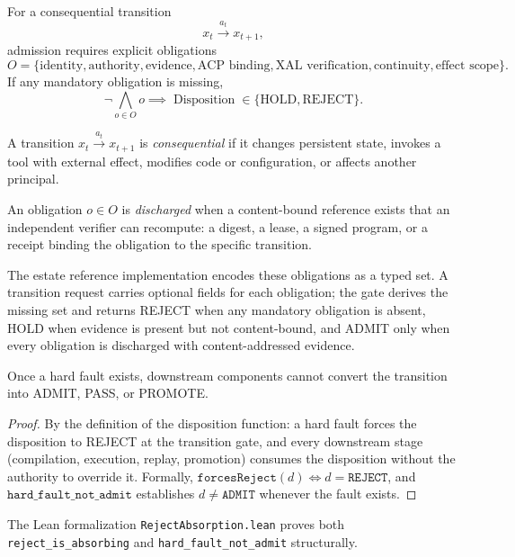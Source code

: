 For a consequential transition
\[
x_t \xrightarrow{a_t} x_{t+1},
\]
admission requires explicit obligations
\[
O = \{\text{identity}, \text{authority}, \text{evidence},
\text{ACP binding}, \text{XAL verification}, \text{continuity},
\text{effect scope}\}.
\]
If any mandatory obligation is missing,
\[
\neg\bigwedge_{o \in O} o \implies
\operatorname{Disposition} \in \{\text{HOLD}, \text{REJECT}\}.
\]

\begin{definition}
A transition $x_t \xrightarrow{a_t} x_{t+1}$ is \emph{consequential} if it
changes persistent state, invokes a tool with external effect, modifies
code or configuration, or affects another principal.
\end{definition}

\begin{definition}
An obligation $o \in O$ is \emph{discharged} when a content-bound reference
exists that an independent verifier can recompute: a digest, a lease, a
signed program, or a receipt binding the obligation to the specific
transition.
\end{definition}

The estate reference implementation encodes these obligations as a typed
set. A transition request carries optional fields for each obligation;
the gate derives the missing set and returns REJECT when any mandatory
obligation is absent, HOLD when evidence is present but not content-bound,
and ADMIT only when every obligation is discharged with content-addressed
evidence.

\begin{theorem}\label{thm:reject-absorbing}
Once a hard fault exists, downstream components cannot convert the
transition into ADMIT, PASS, or PROMOTE.
\end{theorem}

\begin{proof}
By the definition of the disposition function: a hard fault forces the
disposition to REJECT at the transition gate, and every downstream stage
(compilation, execution, replay, promotion) consumes the disposition
without the authority to override it. Formally,
$\texttt{forcesReject}(d) \iff d = \texttt{REJECT}$, and
$\texttt{hard\_fault\_not\_admit}$ establishes $d \neq \texttt{ADMIT}$
whenever the fault exists.
\end{proof}

The Lean formalization \texttt{RejectAbsorption.lean} proves both
\texttt{reject\_is\_absorbing} and \texttt{hard\_fault\_not\_admit}
structurally.
